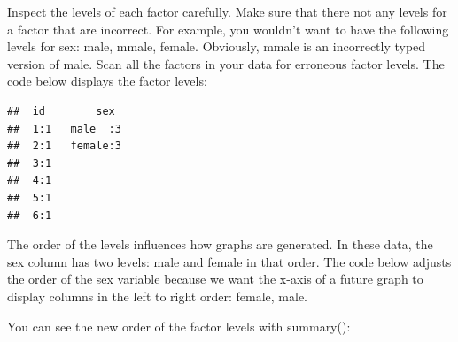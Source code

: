 \documentclass[
]{krantz}
\makeatletter
\newenvironment{Shaded}{\begin{snugshade}}{\end{snugshade}}
\newcommand{\DataTypeTok}[1]{\textcolor[rgb]{0.27,0.27,0.27}{#1}}
\newcommand{\KeywordTok}[1]{\textcolor[rgb]{0.27,0.27,0.27}{\textbf{#1}}}
\newcommand{\NormalTok}[1]{#1}
\newcommand{\OperatorTok}[1]{\textcolor[rgb]{0.43,0.43,0.43}{\textbf{#1}}}
\newcommand{\StringTok}[1]{\textcolor[rgb]{0.5,0.5,0.5}{#1}}
\newenvironment{kframe}{%
\medskip{}
\setlength{\fboxsep}{.8em}
 \def\at@end@of@kframe{}%
 \ifinner\ifhmode%
  \def\at@end@of@kframe{\end{minipage}}%
  \begin{minipage}{\columnwidth}%
 \fi\fi%
 \def\FrameCommand##1{\hskip\@totalleftmargin \hskip-\fboxsep
 \colorbox{shadecolor}{##1}\hskip-\fboxsep
     \hskip-\linewidth \hskip-\@totalleftmargin \hskip\columnwidth}%
 \MakeFramed {\advance\hsize-\width
   \@totalleftmargin\z@ \linewidth\hsize
   \@setminipage}}%
 {\par\unskip\endMakeFramed%
 \at@end@of@kframe}
\renewenvironment{Shaded}{\begin{kframe}}{\end{kframe}}
\makeatother
\begin{document}
Inspect the levels of each factor carefully. Make sure that there not any levels for a factor that are incorrect. For example, you wouldn't want to have the following levels for sex: male, mmale, female. Obviously, mmale is an incorrectly typed version of male. Scan all the factors in your data for erroneous factor levels. The code below displays the factor levels:

\begin{Shaded}
\end{Shaded}

\begin{verbatim}
##  id        sex   
##  1:1   male  :3  
##  2:1   female:3  
##  3:1             
##  4:1             
##  5:1             
##  6:1
\end{verbatim}

The order of the levels influences how graphs are generated. In these data, the sex column has two levels: male and female in that order. The code below adjusts the order of the sex variable because we want the x-axis of a future graph to display columns in the left to right order: female, male.

\begin{Shaded}
\end{Shaded}

You can see the new order of the factor levels with summary():

\begin{Shaded}
\end{Shaded}
\end{document}
